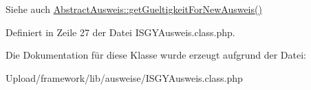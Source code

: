 \begin{DoxySeeAlso}{Siehe auch}
\mbox{\hyperlink{class_abstract_ausweis_a3fdf082a0932510420d85a3c3932eeeb}{Abstract\+Ausweis\+::get\+Gueltigkeit\+For\+New\+Ausweis()}} 
\end{DoxySeeAlso}


Definiert in Zeile 27 der Datei I\+S\+G\+Y\+Ausweis.\+class.\+php.



Die Dokumentation für diese Klasse wurde erzeugt aufgrund der Datei\+:\begin{DoxyCompactItemize}
\item 
Upload/framework/lib/ausweise/I\+S\+G\+Y\+Ausweis.\+class.\+php\end{DoxyCompactItemize}
